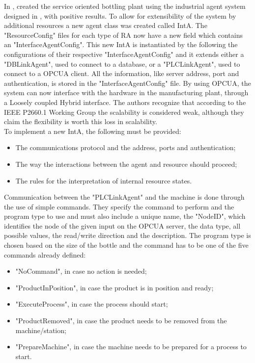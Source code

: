 In \cite{bottling_plant_part2}, \citeauthor{bottling_plant_part2} created the service oriented bottling plant using the industrial agent system designed in \cite{bottling_plant_part1}, with positive results. To allow for extensibility of the system by additional resources a new agent class was created called \acrfull{IntA}. The "ResourceConfig" files for each type of \acrshort{RA} now have a new field which contains an "InterfaceAgentConfig". This new \acrshort{IntA} is instantiated by the  following the configurations of their respective "InterfaceAgentConfig" and it extends either a "DBLinkAgent", used to connect to a database, or a "PLCLinkAgent", used to connect to a \acrshort{OPCUA} client. All the information, like server address, port and authentication, is stored in the "InterfaceAgentConfig" file. By using \acrshort{OPCUA}, the system can now interface with the hardware in the manufacturing plant, through a Loosely coupled Hybrid interface. The authors recognize that according to the IEEE P2660.1 Working Group the scalability is considered weak, although they claim the flexibility is worth this loss in scalability.\\

To implement a new \acrshort{IntA}, the following must be provided:
\begin{itemize}
	\item The communications protocol and the address, ports and authentication;
	\item The way the interactions between the agent and resource should proceed;
	\item The rules for the interpretation of internal resource states.
\end{itemize}

Communication between the "PLCLinkAgent" and the machine is done through the use of simple commands. They specify the command to perform and the program type to use and must also include a unique name, the "NodeID", which identifies the node of the given input on the \acrshort{OPCUA} server, the data type, all possible values, the read/write direction and the description. The program type is chosen based on the size of the bottle and the command has to be one of the five commands already defined:

\begin{itemize}
	\item "NoCommand", in case no action is needed;
	\item "ProductInPosition", in case the product is in position and ready;
	\item "ExecuteProcess", in case the process should start;
	\item "ProductRemoved", in case the product needs to be removed from the machine/station;
	\item "PrepareMachine", in case the machine needs to be prepared for a process to start.
\end{itemize}

